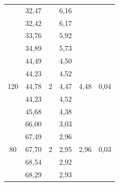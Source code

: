 \documentclass[a4paper, 12pt]{article}
\begin{document}
\begin{table}[H]
\begin{tabular}{|c|ccccc|}
             & \multicolumn{1}{c|}{32,47} & \multicolumn{1}{c|}{} & \multicolumn{1}{c|}{6,16} & \multicolumn{1}{c|}{} &  \\ \cline{2-2} \cline{4-4}
             & \multicolumn{1}{c|}{32,42} & \multicolumn{1}{c|}{} & \multicolumn{1}{c|}{6,17} & \multicolumn{1}{c|}{} &  \\ \cline{2-2} \cline{4-4}
             & \multicolumn{1}{c|}{33,76} & \multicolumn{1}{c|}{} & \multicolumn{1}{c|}{5,92} & \multicolumn{1}{c|}{} &  \\ \cline{2-2} \cline{4-4}
             & \multicolumn{1}{c|}{34,89} & \multicolumn{1}{c|}{} & \multicolumn{1}{c|}{5,73} & \multicolumn{1}{c|}{} &  \\ \hline
            \multirow{5}{*}{120} & \multicolumn{1}{c|}{44,49} & \multicolumn{1}{c|}{\multirow{5}{*}{2}} & \multicolumn{1}{c|}{4,50} & \multicolumn{1}{c|}{\multirow{5}{*}{4,48}} & \multirow{5}{*}{0,04} \\ \cline{2-2} \cline{4-4}
             & \multicolumn{1}{c|}{44,23} & \multicolumn{1}{c|}{} & \multicolumn{1}{c|}{4,52} & \multicolumn{1}{c|}{} &  \\ \cline{2-2} \cline{4-4}
             & \multicolumn{1}{c|}{44,78} & \multicolumn{1}{c|}{} & \multicolumn{1}{c|}{4,47} & \multicolumn{1}{c|}{} &  \\ \cline{2-2} \cline{4-4}
             & \multicolumn{1}{c|}{44,23} & \multicolumn{1}{c|}{} & \multicolumn{1}{c|}{4,52} & \multicolumn{1}{c|}{} &  \\ \cline{2-2} \cline{4-4}
             & \multicolumn{1}{c|}{45,68} & \multicolumn{1}{c|}{} & \multicolumn{1}{c|}{4,38} & \multicolumn{1}{c|}{} &  \\ \hline
            \multirow{5}{*}{80} & \multicolumn{1}{c|}{66,00} & \multicolumn{1}{c|}{\multirow{5}{*}{2}} & \multicolumn{1}{c|}{3,03} & \multicolumn{1}{c|}{\multirow{5}{*}{2,96}} & \multirow{5}{*}{0,03} \\ \cline{2-2} \cline{4-4}
             & \multicolumn{1}{c|}{67,49} & \multicolumn{1}{c|}{} & \multicolumn{1}{c|}{2,96} & \multicolumn{1}{c|}{} &  \\ \cline{2-2} \cline{4-4}
             & \multicolumn{1}{c|}{67,70} & \multicolumn{1}{c|}{} & \multicolumn{1}{c|}{2,95} & \multicolumn{1}{c|}{} &  \\ \cline{2-2} \cline{4-4}
             & \multicolumn{1}{c|}{68,54} & \multicolumn{1}{c|}{} & \multicolumn{1}{c|}{2,92} & \multicolumn{1}{c|}{} &  \\ \cline{2-2} \cline{4-4}
             & \multicolumn{1}{c|}{68,29} & \multicolumn{1}{c|}{} & \multicolumn{1}{c|}{2,93} & \multicolumn{1}{c|}{} &  \\ \hline

\end{tabular}
\end{table}
\end{document}
